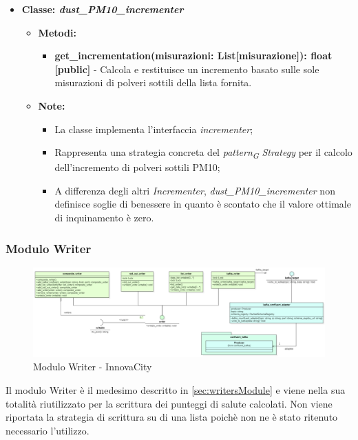 \begin{itemize}
    \item{\textbf{Classe: \textit{dust\_PM10\_incrementer}}}
    \begin{itemize}
        \item \textbf{Metodi:} 
        \begin{itemize}
            \item \textbf{get\_incrementation(misurazioni: List[misurazione]): float [public]} - Calcola e restituisce un incremento basato sulle sole misurazioni di polveri sottili della lista fornita.
        \end{itemize}
        \item\textbf{Note:}
        \begin{itemize}
            \item La classe implementa l'interfaccia \textit{incrementer};
            \item Rappresenta una strategia concreta del \textit{pattern}\textsubscript{\textit{G}} \textit{Strategy} per il calcolo dell'incremento di polveri sottili PM10;
            \item A differenza degli altri \textit{Incrementer}, \textit{dust\_PM10\_incrementer} non definisce soglie di benessere in quanto è scontato che il valore ottimale di inquinamento è zero.
        \end{itemize}
    \end{itemize}

\end{itemize}

\subsubsection{Modulo Writer}
\begin{figure}[H]
    \centering
    \includegraphics[width=1\textwidth]{../Images/SpecificaTecnica/writerModule.PNG}
    \caption{Modulo Writer - InnovaCity}
    \label{fig: healthModelloWriter}
\end{figure}
Il modulo Writer è il medesimo descritto in \ref{sec:writersModule} e viene nella sua totalità riutilizzato per la scrittura dei punteggi di salute calcolati.
Non viene riportata la strategia di scrittura su di una lista poichè non ne è stato ritenuto necessario l'utilizzo.

